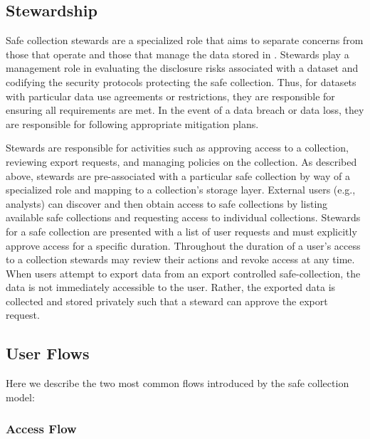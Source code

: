 \subsection{Stewardship}


Safe collection stewards are a specialized role that aims to separate
concerns from those that operate \NAME and those that manage the data stored in \NAMENS.
Stewards play a management role in evaluating the disclosure risks associated with a
dataset and codifying the security protocols protecting the safe collection.
Thus, for datasets with particular data use agreements or restrictions, they 
are responsible for ensuring all requirements are met. In the event of a
data breach or data loss, they are responsible for following appropriate
mitigation plans.

Stewards are responsible for activities such as approving access to a collection, reviewing
export requests, and managing policies on the collection. 
As described above, stewards are pre-associated with a particular safe collection by
way of a specialized role and mapping to a collection's storage layer. 
External users (e.g., analysts) can discover
and then obtain access to safe collections by listing available safe collections and requesting
access to individual collections.
Stewards for a safe collection are presented with a list of user requests and must explicitly approve access
for a specific duration. Throughout the duration of a user's access to a collection
stewards may review their actions and revoke access at any time. When users attempt
to export data from an export controlled safe-collection, the data is not immediately
accessible to the user. Rather, the exported data is collected and stored privately
such that a steward can approve the export request. 


\subsection{User Flows}

Here we describe the two most common flows introduced by the safe collection model:

\subsubsection{Access Flow}

